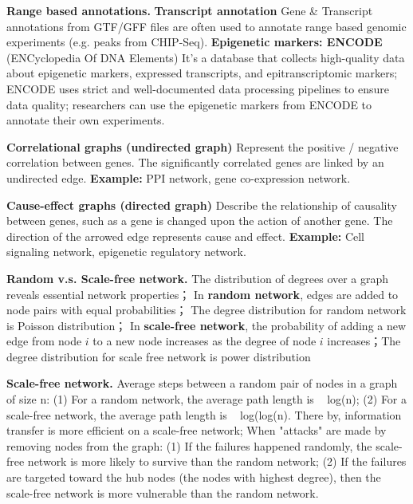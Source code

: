 \vspace{0.1em}\noindent
\textbf{Range based annotations.} \textbf{Transcript annotation} Gene \& Transcript annotations from GTF/GFF files are often used to annotate range based genomic experiments (e.g. peaks from CHIP-Seq). \textbf{Epigenetic markers: ENCODE} (ENCyclopedia Of DNA Elements) It's a database that collects high-quality data about epigenetic markers, expressed transcripts, and epitranscriptomic markers; ENCODE uses strict and well-documented data processing pipelines to ensure data quality; researchers can use the epigenetic markers from ENCODE to annotate their own experiments.

\vspace{0.1em}\noindent
\textbf{Correlational graphs (undirected graph)} Represent the positive / negative correlation between genes. The significantly correlated genes are linked by an undirected edge. \textbf{Example:} PPI network, gene co-expression network.

\vspace{0.1em}\noindent
\textbf{Cause-effect graphs (directed graph)} Describe the relationship of causality between genes, such as a gene is changed upon the action of another gene. The direction of the arrowed edge represents cause and effect. \textbf{Example:} Cell signaling network, epigenetic regulatory network.

\vspace{0.1em}\noindent
\textbf{Random v.s. Scale-free network.} The distribution of degrees over a graph reveals essential network properties； In \textbf{random network}, edges are added to node pairs with equal probabilities； The degree distribution for random network is Poisson distribution； In \textbf{scale-free network}, the probability of adding a new edge from node $i$ to a new node increases as the degree of node $i$ increases；The degree distribution for scale free network is power distribution

\vspace{0.1em}\noindent
\textbf{Scale-free network.} Average steps between a random pair of nodes in a graph of size n: (1) For a random network, the average path length is ~ log(n); (2) For a scale-free network, the average path length is ~ log(log(n). There by, information transfer is more efficient on a scale-free network; When "attacks" are made by removing nodes from the graph: (1) If the failures happened randomly, the scale-free network is more likely to survive than the random network; (2) If the failures are targeted toward the hub nodes (the nodes with highest degree), then the scale-free network is more vulnerable than the random network.

